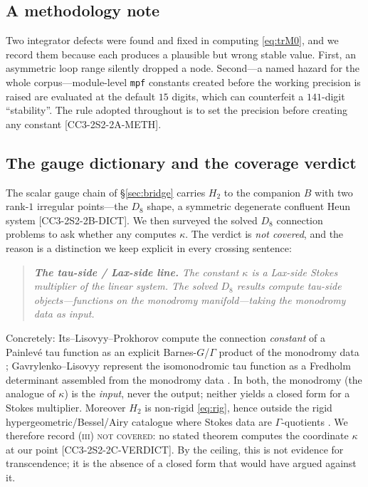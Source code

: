 \documentclass[11pt,reqno]{amsart}
\theoremstyle{plain}
\theoremstyle{definition}
\theoremstyle{remark}
\newcommand{\Htwo}{H_{2}}
\newcommand{\claim}[1]{\textsf{\small[#1]}}
\begin{document}
\subsection{A methodology note}\label{sec:pointmeth}
Two integrator defects were found and fixed in computing \eqref{eq:trM0}, and
we record them because each produces a plausible but wrong stable value. First,
an asymmetric loop range silently dropped a node. Second---a named hazard for
the whole corpus---module-level \texttt{mpf} constants created before the
working precision is raised are evaluated at the default $15$ digits, which can
counterfeit a $141$-digit ``stability''. The rule adopted throughout is to set
the precision before creating any constant \claim{CC3-2S2-2A-METH}.

\subsection{The gauge dictionary and the coverage verdict}\label{sec:coverage}
The scalar gauge chain of \S\ref{sec:bridge} carries $\Htwo$ to the companion
$B$ with two rank-$1$ irregular points---the $D_{8}$ shape, a symmetric
degenerate confluent Heun system \claim{CC3-2S2-2B-DICT}. We then surveyed the
solved $D_{8}$ connection problems to ask whether any computes $\kappa$. The
verdict is \emph{not covered}, and the reason is a distinction we keep explicit
in every crossing sentence:
\begin{quote}\small\itshape
\textbf{The tau-side / Lax-side line.} The constant $\kappa$ is a Lax-side
Stokes multiplier of the linear system. The solved $D_{8}$ results compute
tau-side objects---functions on the monodromy manifold---taking the monodromy
data as input.
\end{quote}
Concretely: Its--Lisovyy--Prokhorov compute the connection \emph{constant} of a
Painlev\'e tau function as an explicit Barnes-$G$/$\Gamma$ product of the
monodromy data \cite{ILP}; Gavrylenko--Lisovyy represent the isomonodromic tau
function as a Fredholm determinant assembled from the monodromy data
\cite{GL}. In both, the monodromy (the analogue of $\kappa$) is the
\emph{input}, never the output; neither yields a closed form for a Stokes
multiplier. Moreover $\Htwo$ is non-rigid \eqref{eq:rig}, hence outside the
rigid hypergeometric/Bessel/Airy catalogue where Stokes data are
$\Gamma$-quotients \cite{FIKN,KatzRLS}. We therefore record \textsc{(iii) not
covered}: no stated theorem computes the coordinate $\kappa$ at our point
\claim{CC3-2S2-2C-VERDICT}. By the ceiling, this is not evidence for
transcendence; it is the absence of a closed form that would have argued
against it.
\end{document}
